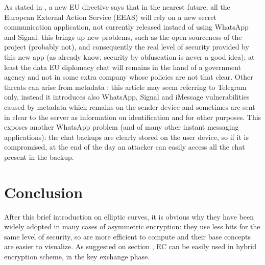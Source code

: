 \documentclass{article}
\begin{document}
As stated in \cite{new_EU}, a new EU directive says that in the nearest future, all the European External Action Service (EEAS) will rely on a new secret communication application, not currently released instaed of using WhatsApp and Signal: this brings up new problems, such as the open sourceness of the project (probably not), and consequently the real level of security provided by this new app (as already know, security by obfuscation is never a good idea); at least the data EU diplomacy chat will remains in the hand of a government agency and not in some extra company whose policies are not that clear.\newline
Other threats can arise from metadata \cite{threat}: this article may seem referring to Telegram only, instead it introduces also WhatsApp, Signal and iMessage vulnerabilities caused by metadata which remains on the sender device and sometimes are sent in clear to the server as information on identification and for other purposes. This exposes another WhatsApp problem (and of many other instant messaging applications): the chat backups are clearly stored on the user device, so if it is compromised, at the end of the day an attacker can easily access all the chat present in the backup.  


\section{Conclusion}


After this brief introduction on elliptic curves, it is obvious why they have been widely adopted in many cases of asymmetric encryption: they use less bits for the same level of security, so are more efficient to compute and their base concepts are easier to visualize. As suggested on section , EC can be easily used in hybrid encryption scheme, in the key exchange phase.





\end{document}
